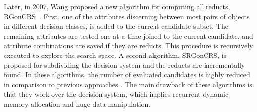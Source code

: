 \documentclass[number,preprint,review,12pt]{elsarticle}
\begin{document}
   
  Later, in 2007, Wang proposed a new algorithm for computing all reducts, RGonCRS~\cite{WangP07}. First, one of the attributes discerning between most pairs of objects in different decision classes, is added to the current candidate subset. The remaining attributes are tested one at a time joined to the current candidate, and attribute combinations are saved if they are reducts. This procedure is recursively executed to explore the search space. A second algorithm, SRGonCRS, is proposed for subdividing the decision system and the reducts are incrementally found. In these algorithms, the number of evaluated candidates is highly reduced in comparison to previous approaches \citep{Bazan2001,Ohrn00}. The main drawback of these algorithms is that they work over the decision system, which implies recurrent dynamic memory allocation and huge data manipulation.
  
  
\end{document}
